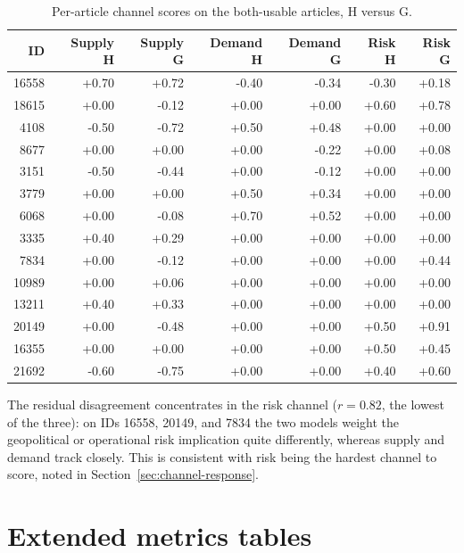 \begin{table}[h]
  \centering
  \small
  \caption{Per-article channel scores on the both-usable articles, H versus G.}
  \label{tab:calibration-channels}
  \begin{tabular}{@{}rrrrrrr@{}}
    \toprule
    ID & Supply H & Supply G & Demand H & Demand G & Risk H & Risk G \\
    \midrule
    16558 & +0.70 & +0.72 & -0.40 & -0.34 & -0.30 & +0.18 \\
    18615 & +0.00 & -0.12 & +0.00 & +0.00 & +0.60 & +0.78 \\
    4108 & -0.50 & -0.72 & +0.50 & +0.48 & +0.00 & +0.00 \\
    8677 & +0.00 & +0.00 & +0.00 & -0.22 & +0.00 & +0.08 \\
    3151 & -0.50 & -0.44 & +0.00 & -0.12 & +0.00 & +0.00 \\
    3779 & +0.00 & +0.00 & +0.50 & +0.34 & +0.00 & +0.00 \\
    6068 & +0.00 & -0.08 & +0.70 & +0.52 & +0.00 & +0.00 \\
    3335 & +0.40 & +0.29 & +0.00 & +0.00 & +0.00 & +0.00 \\
    7834 & +0.00 & -0.12 & +0.00 & +0.00 & +0.00 & +0.44 \\
    10989 & +0.00 & +0.06 & +0.00 & +0.00 & +0.00 & +0.00 \\
    13211 & +0.40 & +0.33 & +0.00 & +0.00 & +0.00 & +0.00 \\
    20149 & +0.00 & -0.48 & +0.00 & +0.00 & +0.50 & +0.91 \\
    16355 & +0.00 & +0.00 & +0.00 & +0.00 & +0.50 & +0.45 \\
    21692 & -0.60 & -0.75 & +0.00 & +0.00 & +0.40 & +0.60 \\
    \bottomrule
  \end{tabular}
\end{table}

The residual disagreement concentrates in the risk channel ($r = 0.82$, the lowest of the three): on IDs 16558, 20149, and 7834 the two models weight the geopolitical or operational risk implication quite differently, whereas supply and demand track closely. This is consistent with risk being the hardest channel to score, noted in Section~\ref{sec:channel-response}.

\chapter{Extended metrics tables}\label{app:metrics}

